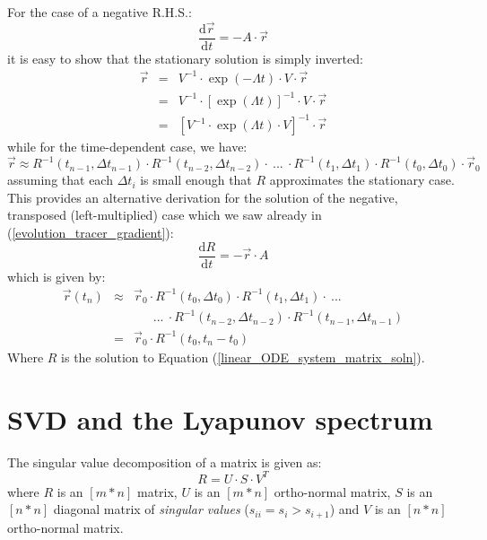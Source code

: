 \documentclass[11pt]{article}
\begin{document}
For the case of a negative R.H.S.:
\begin{equation}
\frac{\mathrm d \vec r}{\mathrm d t} = - A \cdot \vec r
\end{equation}
it is easy to show that the stationary solution is simply inverted:
\begin{eqnarray}
\vec r & = & V^{-1} \cdot \exp (-\Lambda t) \cdot V \cdot \vec r \\
& = & V^{-1} \cdot \left [ \exp (\Lambda t) \right ]^{-1} \cdot V \cdot \vec r \\
& = & \left [V^{-1} \cdot \exp (\Lambda t) \cdot V \right]^{-1} \cdot \vec r 
\end{eqnarray}
while for the time-dependent case, we have:
\begin{equation}
\vec r \approx R^{-1}(t_{n-1},\Delta t_{n-1}) \cdot R^{-1}(t_{n-2}, \Delta t_{n-2}) \cdot ~ ... 
~ \cdot R^{-1}(t_1,\Delta t_1) \cdot R^{-1}(t_0,\Delta t_0) \cdot \vec r_0
\end{equation}
assuming that each $\Delta t_i$ is small enough that $R$ approximates the 
stationary case.
This provides an alternative derivation for the solution of the negative,
transposed (left-multiplied) case which we saw already in (\ref{evolution_tracer_gradient}):
\begin{equation}
\frac{\mathrm d R}{\mathrm d t} = -\vec r \cdot A
\end{equation}
which is given by:
\begin{eqnarray}
\vec r(t_n) & \approx & \vec r_0 \cdot R^{-1}(t_0,\Delta t_0) \cdot R^{-1}(t_1, \Delta t_1) \cdot ~ ... 
~ \nonumber \\
& & ~~~~~~~...~\cdot R^{-1}(t_{n-2},\Delta t_{n-2}) \cdot R^{-1}(t_{n-1},\Delta t_{n-1}) \\
& = & \vec r_0 \cdot R^{-1}(t_0, t_n-t_0)
\end{eqnarray}
Where $R$ is the solution to Equation (\ref{linear_ODE_system_matrix_soln}).

\section{SVD and the Lyapunov spectrum}

The singular value decomposition of a matrix is given as:
\begin{equation}
R=U\cdot S\cdot V^T
\label{SVD_def}
\end{equation}
where $R$ is an $[m*n]$ matrix, $U$ is an $[m*n]$ ortho-normal
matrix, $S$ is an $[n*n]$ diagonal matrix of {\it singular values}
($s_{ii}=s_i>s_{i+1}$) and $V$ is an $[n*n]$ ortho-normal matrix.
\end{document}
